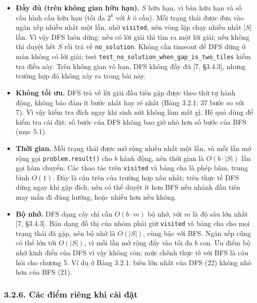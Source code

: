 \begin{itemize}
\tightlist
\item
  \textbf{Đầy đủ (trên không gian hữu hạn).} \(S\) hữu hạn, vì bàn hữu hạn và số cấu hình cầu hữu hạn (tối đa \(2^k\) với \(k\) ô cầu). Mỗi trạng thái được đưa vào ngăn xếp nhiều nhất một lần, nhờ \texttt{visited}, nên vòng lặp chạy nhiều nhất \(|S|\) lần. Vì vậy DFS luôn dừng: nếu có lời giải thì tìm ra một lời giải; nếu không thì duyệt hết \(S\) rồi trả về \texttt{no\_\allowbreak{}solution}. Không cần timeout để DFS dừng ở màn không có lời giải; test \texttt{test\_\allowbreak{}no\_\allowbreak{}solution\_\allowbreak{}when\_\allowbreak{}gap\_\allowbreak{}is\_\allowbreak{}two\_\allowbreak{}tiles} kiểm tra điều này. Trên không gian vô hạn, DFS không đầy đủ {[}7, §3.4.3{]}, nhưng trường hợp đó không xảy ra trong bài này.
\item
  \textbf{Không tối ưu.} DFS trả về lời giải đầu tiên gặp được theo thứ tự hành động, không bảo đảm ít bước nhất hay rẻ nhất (Bảng 3.2.1: 37 bước so với 7). Vì vậy kiểm tra đích ngay khi sinh nút không làm mất gì. Hệ quả dùng để kiểm tra cài đặt: số bước của DFS không bao giờ nhỏ hơn số bước của BFS (mục 5.1).
\item
  \textbf{Thời gian.} Mỗi trạng thái được mở rộng nhiều nhất một lần, và mỗi lần mở rộng gọi \texttt{problem.\allowbreak{}result()} cho \(b\) hành động, nên thời gian là \(O(b \cdot |S|)\) lần gọi hàm chuyển. Các thao tác trên \texttt{visited} và bảng cha là phép băm, trung bình \(O(1)\). Đây là cận trên của trường hợp xấu nhất; trên thực tế DFS dừng ngay khi gặp đích, nên có thể duyệt ít hơn BFS nếu nhánh đầu tiên may mắn đi đúng hướng, hoặc nhiều hơn nếu không.
\item
  \textbf{Bộ nhớ.} DFS dạng cây chỉ cần \(O(b \cdot m)\) bộ nhớ, với \(m\) là độ sâu lớn nhất {[}7, §3.4.3{]}. Bản dạng đồ thị của nhóm phải giữ \texttt{visited} và bảng cha cho mọi trạng thái đã gặp, nên bộ nhớ là \(O(|S|)\), cùng bậc với BFS. Ngăn xếp cũng có thể lớn tới \(O(|S|)\), vì mỗi lần mở rộng đẩy vào tối đa \(b\) con. Ưu điểm bộ nhớ kinh điển của DFS vì vậy không còn; mức chênh thực tế với BFS là câu hỏi cho chương 5. Ví dụ ở Bảng 3.2.1: biên lớn nhất của DFS (22) không nhỏ hơn của BFS (21).
\end{itemize}

\subsubsection{3.2.6. Các điểm riêng khi cài đặt}

